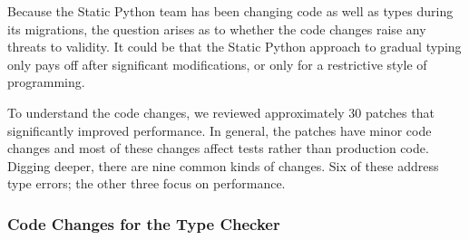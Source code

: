\documentclass[english,cleveref,submission]{programming}
\newcommand{\SP}{Static Python}
\begin{document}
Because the \SP{} team has been changing code as well as types
during its migrations, the question arises as to whether the code changes
raise any threats to validity.
It could be that the \SP{} approach to gradual typing only pays off
after significant modifications, or only for a restrictive style of programming.

To understand the code changes, we reviewed approximately 30 patches that
significantly improved performance.
In general, the patches have minor code changes and most of these changes
affect tests rather than production code.
Digging deeper, there are nine common kinds of changes.
Six of these address type errors; the other three focus on performance.


\subsubsection{Code Changes for the Type Checker}

\end{document}
